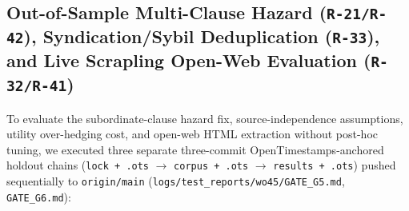 \documentclass[11pt,a4paper]{article}
\begin{document}
\begin{itemize}
\end{itemize}

\subsection{Out-of-Sample Multi-Clause Hazard (\texttt{R-21/R-42}), Syndication/Sybil Deduplication (\texttt{R-33}), and Live Scrapling Open-Web Evaluation (\texttt{R-32/R-41})}
\label{sec:wo45_g5_g6}
To evaluate the subordinate-clause hazard fix, source-independence assumptions, utility over-hedging cost, and open-web HTML extraction without post-hoc tuning, we executed three separate three-commit OpenTimestamps-anchored holdout chains (\texttt{lock + .ots} $\rightarrow$ \texttt{corpus + .ots} $\rightarrow$ \texttt{results + .ots}) pushed sequentially to \texttt{origin/main} (\texttt{logs/test\_reports/wo45/GATE\_G5.md}, \texttt{GATE\_G6.md}):
\end{document}

